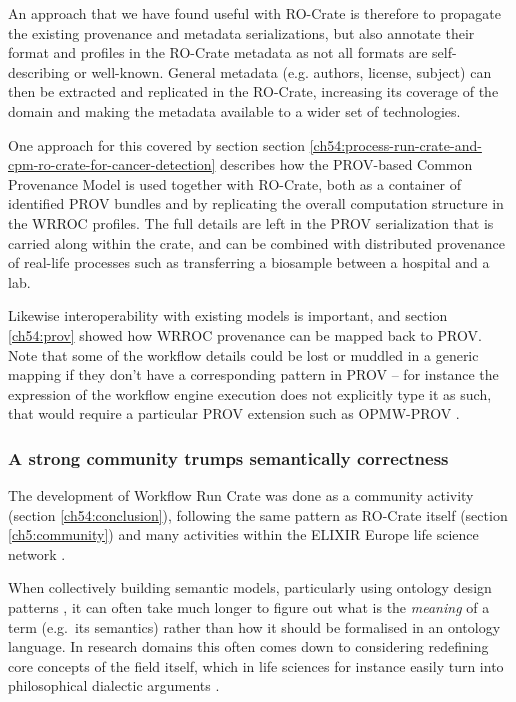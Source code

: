 An approach that we have found useful with RO-Crate is therefore to propagate the existing provenance and metadata serializations, but also annotate their format and profiles in the RO-Crate metadata as not all formats are self-describing or well-known. General metadata (e.g. authors, license, subject) can then be extracted and replicated in the RO-Crate, increasing its coverage of the domain and making the metadata available to a wider set of technologies. 

One approach for this covered by section section \vref{ch54:process-run-crate-and-cpm-ro-crate-for-cancer-detection} describes how the PROV-based Common Provenance Model \cite{Wittner 2023} is used together with RO-Crate, both as a container of identified PROV bundles and by replicating the overall computation structure in the WRROC profiles.  The full details are left in the PROV serialization that is carried along within the crate, and can be combined with distributed provenance of real-life processes such as transferring a biosample between a hospital and a lab. 

Likewise interoperability with existing models is important, and section \vref{ch54:prov} showed how WRROC provenance can be mapped back to PROV. Note that some of the workflow details could be lost or muddled in a generic mapping if they don't have a corresponding pattern in PROV -- for instance the expression of the workflow engine execution does not explicitly type it as such, that would require a particular PROV extension such as OPMW-PROV \cite{Garijo 2011}. 


\subsubsection{A strong community trumps semantically correctness}

The development of Workflow Run Crate was done as a community activity (section \vref{ch54:conclusion}), following the same pattern as RO-Crate itself (section \vref{ch5:community}) and many activities within the ELIXIR Europe life science network \cite{Harrow 2022}. 

When collectively building semantic models, particularly using ontology design patterns \cite{Hitzler 2016}, it can often take much longer to figure out what is the \emph{meaning} of a term (e.g.~its semantics) rather than how it should be formalised in an ontology language. In research domains this often comes down to considering redefining core concepts of the field itself, which in life sciences for instance easily turn into philosophical dialectic arguments \cite{Falk 2010}. 

